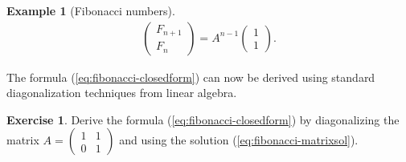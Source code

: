 \documentclass[11pt]{report}
\theoremstyle{plain}
\theoremstyle{definition}
\newtheorem{example}[thm]{Example}
\newtheorem{xexercise}[thm]{Exercise}
\begin{document}
\begin{example}[Fibonacci numbers]
\begin{equation*} \tag{34}\label{eq:fibonacci-matrixsol}
\begin{split}
\left(\begin{array}{c}
F_{n+1}\\F_n
\end{array}\right) = A^{n-1}
\left(\begin{array}{c}
1\\1
\end{array}\right).
\end{split}
\end{equation*}

The formula (\ref{eq:fibonacci-closedform}) can now be
derived using standard diagonalization techniques from
linear algebra.
\end{example}

\begin{xexercise}
Derive the formula (\ref{eq:fibonacci-closedform}) by
diagonalizing the matrix
$A=\left(\begin{array}{cc}
1&1\\0&1\end{array}\right)$
and using the solution (\ref{eq:fibonacci-matrixsol}).
\end{xexercise}
\end{document}
